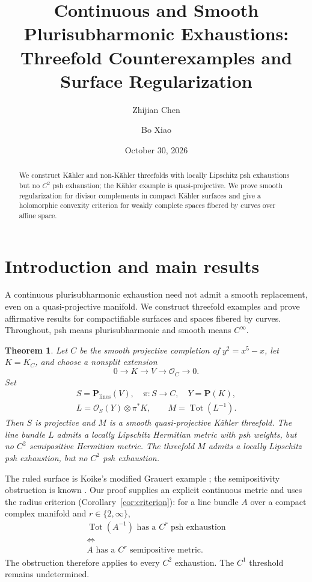 \documentclass[11pt]{amsart}
\title[Continuous and smooth plurisubharmonic exhaustions]{Continuous and Smooth
Plurisubharmonic Exhaustions:\\
Threefold Counterexamples and Surface Regularization}
\author{Zhijian Chen}
\author{Bo Xiao}
\date{October 30, 2026}
\newtheorem{theorem}{Theorem}[section]
\theoremstyle{definition}
\theoremstyle{remark}
\numberwithin{equation}{section}
\newcommand{\PP}{\mathbf P}
\newcommand{\OO}{\mathcal O}
\newcommand{\Tot}{\operatorname{Tot}}
\begin{document}
\begin{abstract}
We construct K\"ahler and non-K\"ahler threefolds with locally Lipschitz
psh exhaustions but no $C^2$ psh exhaustion; the K\"ahler example is
quasi-projective. We prove smooth regularization for divisor complements
in compact K\"ahler surfaces and give a holomorphic convexity criterion
for weakly complete spaces fibered by curves over affine space.
\end{abstract}
\maketitle
\tableofcontents
\newpage

\section{Introduction and main results}\label{sec:intro}

A continuous plurisubharmonic exhaustion need not admit a smooth
replacement, even on a quasi-projective manifold. We construct
threefold examples and prove affirmative results for compactifiable
surfaces and spaces fibered by curves. Throughout, psh means
plurisubharmonic and smooth means $C^\infty$.

\begin{theorem}\label{thm:main}
Let $C$ be the smooth projective completion of $y^2=x^5-x$, let
$K=K_C$, and choose a nonsplit extension
\begin{equation}\label{eq:extension-intro}
0\longrightarrow K\longrightarrow V\longrightarrow\OO_C
\longrightarrow0.
\end{equation}
Set
\begin{equation}\label{eq:main-line}
\begin{gathered}
S=\PP_{\mathrm{lines}}(V),\quad \pi:S\to C,\quad Y=\PP(K),\\
L=\OO_S(Y)\otimes\pi^*K,\qquad M=\Tot(L^{-1}).
\end{gathered}
\end{equation}
Then $S$ is projective and $M$ is a smooth quasi-projective K\"ahler
threefold. The line bundle $L$ admits a locally Lipschitz Hermitian
metric with psh weights, but no $C^2$ semipositive Hermitian metric.
The threefold $M$ admits a locally Lipschitz psh exhaustion, but no
$C^2$ psh exhaustion.
\end{theorem}

The ruled surface is Koike's modified Grauert example
\cite[Example~4.1]{Koike2021}; the semipositivity obstruction is known
\cite[Theorem~1.4]{Koike2021}\cite[Remark~2.8]{Wu2026}.
Our proof supplies an explicit continuous metric and uses the radius
criterion (Corollary~\ref{cor:criterion}): for a line bundle $A$ over
a compact complex manifold and $r\in\{2,\infty\}$,
\[
\begin{gathered}
\Tot(A^{-1})\text{ has a }C^r\text{ psh exhaustion}
\\\Longleftrightarrow\\
A\text{ has a }C^r\text{ semipositive metric}.
\end{gathered}
\]
The obstruction therefore applies to every $C^2$ exhaustion. The
$C^1$ threshold remains undetermined.
\end{document}
